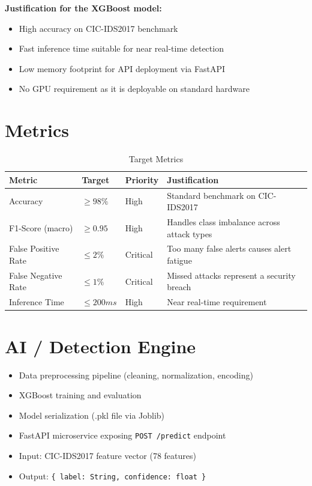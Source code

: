 \documentclass[12pt,a4paper]{article}
\begin{document}
\vskip0.5cm
\noindent\textbf{Justification for the XGBoost model:}
\vskip0.5cm
\begin{itemize}
  \item High accuracy on CIC-IDS2017 benchmark
  \item Fast inference time suitable for near real-time detection
  \item Low memory footprint for API deployment via FastAPI
  \item No GPU requirement as it is deployable on standard hardware
\end{itemize}

\section{Metrics}

\begin{table}[h!]
  \begin{center}
    \begin{tabularx}{\textwidth}{|l|l|l|X|}
      \hline
      \textbf{Metric}     & \textbf{Target} & \textbf{Priority} & \textbf{Justification}                          \\
      \hline
      Accuracy            & $\geq 98\%$     & High              & Standard benchmark on CIC-IDS2017               \\
      \hline
      F1-Score (macro)    & $\geq 0.95$     & High              & Handles class imbalance across attack types     \\
      \hline
      False Positive Rate & $\leq 2\%$      & Critical          & Too many false alerts causes alert fatigue      \\
      \hline
      False Negative Rate & $\leq 1\%$      & Critical          & Missed attacks represent a security breach      \\
      \hline
      Inference Time      & $\leq 200ms$    & High              & Near real-time requirement\\
      \hline
    \end{tabularx}
    \caption{Target Metrics }
    \label{tab2}
  \end{center}
\end{table}

\section{AI / Detection Engine}

\begin{itemize}
  \item Data preprocessing pipeline (cleaning, normalization, encoding)
  \item XGBoost training and evaluation
  \item Model serialization (.pkl file via Joblib)
  \item FastAPI microservice exposing \texttt{POST /predict} endpoint
  \item Input: CIC-IDS2017 feature vector (78 features)
  \item Output: \texttt{\{ label: String, confidence: float \}}
\end{itemize}
\end{document}
